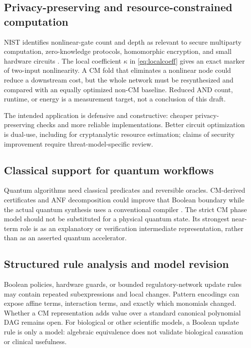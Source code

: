 \subsection{Privacy-preserving and resource-constrained computation}
NIST identifies nonlinear-gate count and depth as relevant to secure multiparty computation, zero-knowledge protocols, homomorphic encryption, and small hardware circuits \cite{nist}. The local coefficient $\kappa$ in \cref{eq:localcoeff} gives an exact marker of two-input nonlinearity. A CM fold that eliminates a nonlinear node could reduce a downstream cost, but the whole network must be resynthesized and compared with an equally optimized non-CM baseline. Reduced AND count, runtime, or energy is a measurement target, not a conclusion of this draft.

The intended application is defensive and constructive: cheaper privacy-preserving checks and more reliable implementations. Better circuit optimization is dual-use, including for cryptanalytic resource estimation; claims of security improvement require threat-model-specific review.

\subsection{Classical support for quantum workflows}
Quantum algorithms need classical predicates and reversible oracles. CM-derived certificates and ANF decomposition could improve that Boolean boundary while the actual quantum synthesis uses a conventional compiler \cite{xag}. The strict CM phase model should not be substituted for a physical quantum state. Its strongest near-term role is as an explanatory or verification intermediate representation, rather than as an asserted quantum accelerator.

\subsection{Structured rule analysis and model revision}
Boolean policies, hardware guards, or bounded regulatory-network update rules may contain repeated subexpressions and local changes. Pattern encodings can expose affine terms, interaction terms, and exactly which monomials changed. Whether a CM representation adds value over a standard canonical polynomial DAG remains open. For biological or other scientific models, a Boolean update rule is only a model: algebraic equivalence does not validate biological causation or clinical usefulness.

